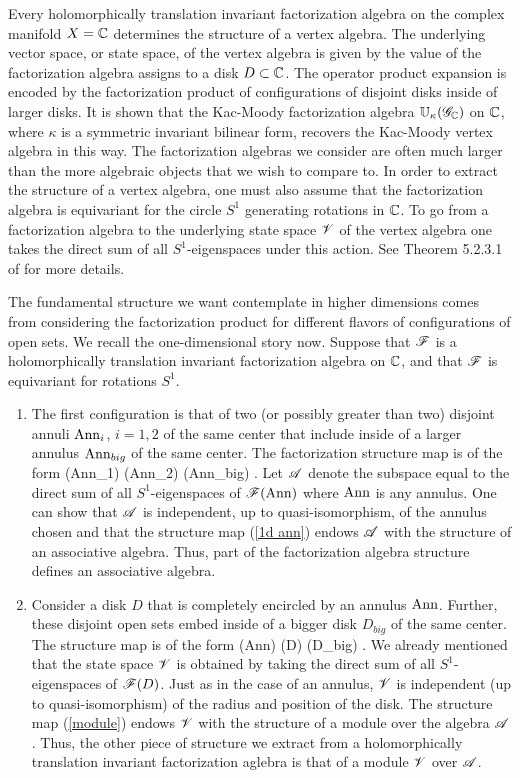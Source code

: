 \documentclass[10pt]{amsart}
\begin{document}
Every holomorphically translation invariant factorization algebra on the complex manifold $X = \mathbb C$ determines the structure of a vertex algebra.
The underlying vector space, or state space, of the vertex algebra is given by the value of the factorization algebra assigns to a disk $D \subset \mathbb C$. 
The operator product expansion is encoded by the factorization product of configurations of disjoint disks inside of larger disks. 
It is shown that the Kac-Moody factorization algebra $\mathbb U_{\kappa}(\mathscr G_\mathbb C)$ on $\mathbb C$, where $\kappa$ is a symmetric invariant bilinear form, recovers the Kac-Moody vertex algebra in this way. 
The factorization algebras we consider are often much larger than the more algebraic objects that we wish to compare to. 
In order to extract the structure of a vertex algebra, one must also assume that the factorization algebra is equivariant for the circle $S^1$ generating rotations in $\mathbb C$. 
To go from a factorization algebra to the underlying state space $\mathscr V$ of the vertex algebra one takes the direct sum of all $S^1$-eigenspaces under this action. 
See Theorem 5.2.3.1 of \cite{CG1} for more details.

The fundamental structure we want contemplate in higher dimensions comes from considering the factorization product for different flavors of configurations of open sets. 
We recall the one-dimensional story now.
Suppose that $\mathscr F$ is a holomorphically translation invariant factorization algebra on $\mathbb C$, and that $\mathscr F$ is equivariant for rotations $S^1$.
\begin{enumerate}
\item The first configuration is that of two (or possibly greater than two) disjoint annuli ${\rm Ann}_i$, $i=1,2$ of the same center that include inside of a larger annulus ${\rm Ann}_{big}$ of the same center. 
The factorization structure map is of the form
\beqn\label{1d ann}
\sF({\rm Ann}_1) \tensor \sF({\rm Ann}_2) \to \sF({\rm Ann}_{big}) .
\eeqn
Let $\mathscr A$ denote the subspace equal to the direct sum of all $S^1$-eigenspaces of $\mathscr F({\rm Ann})$ where ${\rm Ann}$ is any annulus.
One can show that $\mathscr A$ is independent, up to quasi-isomorphism, of the annulus chosen and that the structure map (\ref{1d ann}) endows $\mathscr A$ with the structure of an associative algebra.
Thus, part of the factorization algebra structure defines an associative algebra.
\item
Consider a disk $D$ that is completely encircled by an annulus ${\rm Ann}$.
Further, these disjoint open sets embed inside of a bigger disk $D_{big}$ of the same center.
The structure map is of the form
\beqn\label{module}
\sF({\rm Ann}) \tensor \sF(D) \to \sF(D_{big}) .
\eeqn
We already mentioned that the state space $\mathscr V$ is obtained by taking the direct sum of all $S^1$-eigenspaces of $\mathscr F(D)$.
Just as in the case of an annulus, $\mathscr V$ is independent (up to quasi-isomorphism) of the radius and position of the disk.
The structure map (\ref{module}) endows $\mathscr V$ with the structure of a module over the algebra $\mathscr A$.
Thus, the other piece of structure we extract from a holomorphically translation invariant factorization aglebra is that of a module $\mathscr V$ over $\mathscr A$. 
\end{enumerate} 
\end{document}
